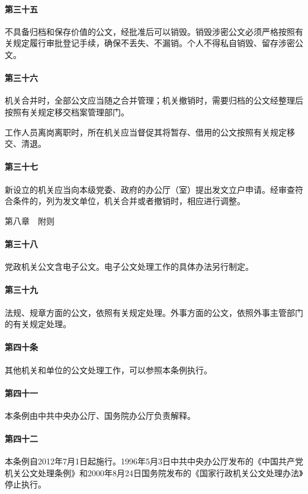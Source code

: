 \documentclass{gbt9704}
\begin{document}
\paragraph{第三十五}不具备归档和保存价值的公文，经批准后可以销毁。销毁涉密公文必须严格按照有关规定履行审批登记手续，确保不丢失、不漏销。个人不得私自销毁、留存涉密公文。

\paragraph{第三十六}机关合并时，全部公文应当随之合并管理；机关撤销时，需要归档的公文经整理后按照有关规定移交档案管理部门。

工作人员离岗离职时，所在机关应当督促其将暂存、借用的公文按照有关规定移交、清退。
\paragraph{第三十七}新设立的机关应当向本级党委、政府的办公厅（室）提出发文立户申请。经审查符合条件的，列为发文单位，机关合并或者撤销时，相应进行调整。


第八章　附则


\paragraph{第三十八}党政机关公文含电子公文。电子公文处理工作的具体办法另行制定。

\paragraph{第三十九}法规、规章方面的公文，依照有关规定处理。外事方面的公文，依照外事主管部门的有关规定处理。

\paragraph{第四十条}
其他机关和单位的公文处理工作，可以参照本条例执行。

\paragraph{第四十一}本条例由中共中央办公厅、国务院办公厅负责解释。

\paragraph{第四十二}本条例自2012年7月1日起施行。1996年5月3日中共中央办公厅发布的《中国共产党机关公文处理条例》和2000年8月24日国务院发布的《国家行政机关公文处理办法》停止执行。
\end{document}
